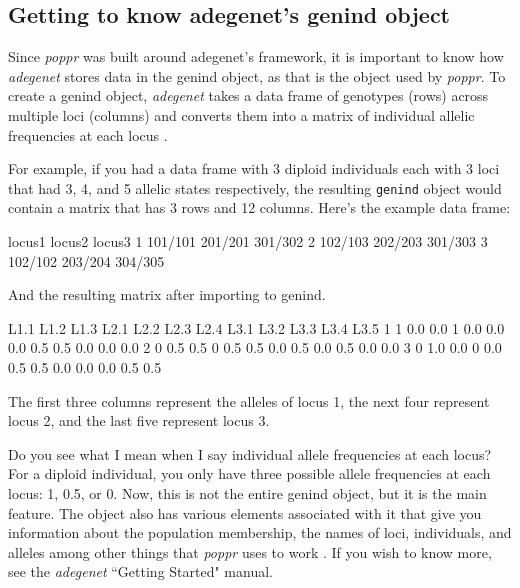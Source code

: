 \documentclass[letterpaper]{article}
\newcommand{\tab}{\hspace*{1em}}
\begin{document}
\subsection{Getting to know adegenet's genind object}\label{intro:genind}

\tab\tab Since \textit{poppr} was built around adegenet's framework, it is important to know how \textit{adegenet} stores data in the genind object, as that is the object used by \textit{poppr}. To create a genind object, \textit{adegenet} takes a data frame of genotypes (rows) across multiple loci (columns) and converts them into a matrix of individual allelic frequencies at each locus \cite{Jombart:2008}.

For example, if you had a data frame with 3 diploid individuals each with 3 loci that had 3, 4, and 5 allelic states respectively, the resulting \texttt{genind} object would contain a matrix that has 3 rows and 12 columns. 
\noindent Here's the example data frame:
\begin{Schunk}
\begin{Soutput}
   locus1  locus2  locus3
1 101/101 201/201 301/302
2 102/103 202/203 301/303
3 102/102 203/204 304/305
\end{Soutput}
\end{Schunk}
And the resulting matrix after importing to genind.
\begin{Schunk}
\begin{Soutput}
  L1.1 L1.2 L1.3 L2.1 L2.2 L2.3 L2.4 L3.1 L3.2 L3.3 L3.4 L3.5
1    1  0.0  0.0    1  0.0  0.0  0.0  0.5  0.5  0.0  0.0  0.0
2    0  0.5  0.5    0  0.5  0.5  0.0  0.5  0.0  0.5  0.0  0.0
3    0  1.0  0.0    0  0.0  0.5  0.5  0.0  0.0  0.0  0.5  0.5
\end{Soutput}
\end{Schunk}
The first three columns represent the alleles of locus 1, the next four represent locus 2, and the last five represent locus 3.

Do you see what I mean when I say individual allele frequencies at each locus? For a diploid individual, you only have three possible allele frequencies at each locus: 1, 0.5, or 0. Now, this is not the entire genind object, but it is the main feature. The object also has various elements associated with it that give you information about the population membership, the names of loci, individuals, and alleles among other things that \textit{poppr} uses to work \cite{Jombart:2008}. If you wish to know more, see the \textit{adegenet} ``Getting Started" manual. 
\end{document}
